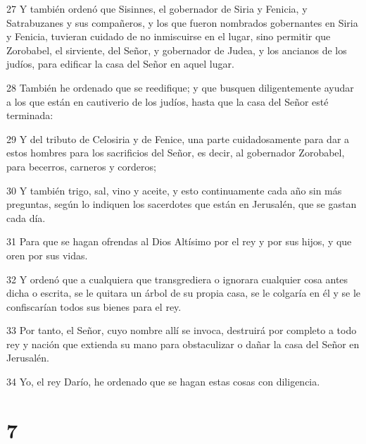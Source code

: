 \par 27 Y también ordenó que Sisinnes, el gobernador de Siria y Fenicia, y Satrabuzanes y sus compañeros, y los que fueron nombrados gobernantes en Siria y Fenicia, tuvieran cuidado de no inmiscuirse en el lugar, sino permitir que Zorobabel, el sirviente, del Señor, y gobernador de Judea, y los ancianos de los judíos, para edificar la casa del Señor en aquel lugar.
\par 28 También he ordenado que se reedifique; y que busquen diligentemente ayudar a los que están en cautiverio de los judíos, hasta que la casa del Señor esté terminada:
\par 29 Y del tributo de Celosiria y de Fenice, una parte cuidadosamente para dar a estos hombres para los sacrificios del Señor, es decir, al gobernador Zorobabel, para becerros, carneros y corderos;
\par 30 Y también trigo, sal, vino y aceite, y esto continuamente cada año sin más preguntas, según lo indiquen los sacerdotes que están en Jerusalén, que se gastan cada día.
\par 31 Para que se hagan ofrendas al Dios Altísimo por el rey y por sus hijos, y que oren por sus vidas.
\par 32 Y ordenó que a cualquiera que transgrediera o ignorara cualquier cosa antes dicha o escrita, se le quitara un árbol de su propia casa, se le colgaría en él y se le confiscarían todos sus bienes para el rey.
\par 33 Por tanto, el Señor, cuyo nombre allí se invoca, destruirá por completo a todo rey y nación que extienda su mano para obstaculizar o dañar la casa del Señor en Jerusalén.
\par 34 Yo, el rey Darío, he ordenado que se hagan estas cosas con diligencia.

\chapter{7}

